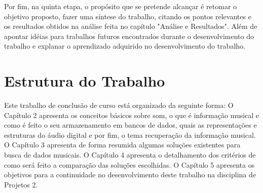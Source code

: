Por fim, na quinta etapa, o propósito que se pretende alcançar é retomar o objetivo proposto, fazer uma síntese do trabalho, citando os pontos relevantes e os resultados obtidos na análise feita no capítulo "Análise e Resultados". Além de apontar idéias para trabalhos futuros encontrados durante o desenvolvimento do trabalho e explanar o aprendizado adquirido no desenvolvimento do trabalho.

\section{Estrutura do Trabalho}
Este trabalho de conclusão de curso está organizado da seguinte forma: O Capítulo 2 apresenta os conceitos básicos sobre som, o que é informação musical e como é feito o seu armazenamento em bancos de dados, quais as representações e estruturas do áudio digital e por fim, o tema recuperação da informação musical. O Capítulo 3 apresenta de forma resumida algumas soluções existentes para busca de dados musicais. O Capítulo 4 apresenta o detalhamento dos critérios de como será feito a comparação das soluções escolhidas. O Capítulo 5 apresenta os objetivos para a continuidade no desenvolvimento deste trabalho na disciplina de Projetos 2.